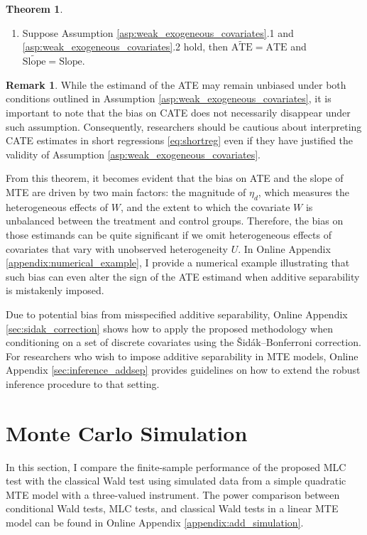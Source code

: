 \documentclass[11pt]{article}
\theoremstyle{definition}
\newtheorem{theorem}{Theorem}[section]
\newtheorem{remark}{Remark}[section]
\newcommand{\0}{\ensuremath{\mathbf{0}}}
\begin{document}
\begin{bibunit}
\begin{theorem}
\begin{enumerate}
\begin{align*}
        \end{align*}
        \item Suppose Assumption \ref{asp:weak_exogeneous_covariates}.1 and \ref{asp:weak_exogeneous_covariates}.2 hold, then $\widetilde{\text{ATE}} = \text{ATE}$ and 
        $\widetilde{\text{Slope}} = \text{Slope}$.
    \end{enumerate}
\end{theorem}
\begin{remark}
    While the estimand of the ATE may remain unbiased under both conditions outlined in Assumption \ref{asp:weak_exogeneous_covariates}, it is important to note that the bias on CATE does not necessarily disappear under such assumption. Consequently, researchers should be cautious about interpreting CATE estimates in short regressions \eqref{eq:shortreg} even if they have justified the validity of Assumption \ref{asp:weak_exogeneous_covariates}.
\end{remark}
From this theorem, it becomes evident that the bias on ATE and the slope of MTE are driven by two main factors: the magnitude of $\eta_d$, which measures the heterogeneous effects of $W$, and the extent to which the covariate $W$ is unbalanced between the treatment and control groups. Therefore, the bias on those estimands can be quite significant if we omit heterogeneous effects of covariates that vary with unobserved heterogeneity $U$. In Online Appendix \ref{appendix:numerical_example}, I provide a numerical example illustrating that such bias can even alter the sign of the ATE estimand when additive separability is mistakenly imposed.

Due to potential bias from misspecified additive separability, Online Appendix \ref{sec:sidak_correction} shows how to apply the proposed methodology when conditioning on a set of discrete covariates using the Šidák–Bonferroni correction. For researchers who wish to impose additive separability in MTE models, Online Appendix \ref{sec:inference_addsep} provides guidelines on how to extend the robust inference procedure to that setting.


%
\section{Monte Carlo Simulation}
\label{sec:simulation}
In this section, I compare the finite-sample performance of the proposed MLC test with the classical Wald test using simulated data from a simple quadratic MTE model with a three-valued instrument. The power comparison between conditional Wald tests, MLC tests, and classical Wald tests in a linear MTE model can be found in Online Appendix \ref{appendix:add_simulation}.


\end{bibunit}
\end{document}
